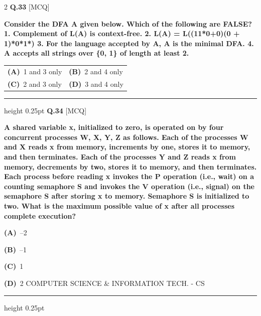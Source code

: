 \documentclass[a4paper,10pt,twoside]{article}
\begin{document}
\begin{multicols}{2}
\noindent\textbf{Q.33} \hfill {\footnotesize\textsf{[MCQ]}}
\par\vspace{2pt}
{\bfseries Consider the DFA A given below.
Which of the following are FALSE?
1. Complement of L(A) is context-free.
2. L(A) = L((11*0+0)(0 + 1)*0*1*)
3. For the language accepted by A, A is the minimal DFA.
4. A accepts all strings over \{0, 1\} of length at least 2. \par}
\par\vspace{2pt}\noindent
\begin{tabular*}{\columnwidth}{@{\extracolsep{\fill}}p{}p{}@{}}
\textbf{(A)}~1 and 3 only & \textbf{(B)}~2 and 4 only \\
\addlinespace[2pt]
\textbf{(C)}~2 and 3 only & \textbf{(D)}~3 and 4 only
\end{tabular*}
\par\vspace{6pt}\hrule height 0.25pt\vspace{6pt}
\noindent\textbf{Q.34} \hfill {\footnotesize\textsf{[MCQ]}}
\par\vspace{2pt}
{\bfseries A shared variable x, initialized to zero, is operated on by four concurrent processes W, X, Y, Z as
follows. Each of the processes W and X reads x from memory, increments by one, stores it to
memory, and then terminates. Each of the processes Y and Z reads x from memory, decrements by
two, stores it to memory, and then terminates. Each process before reading x invokes the P
operation (i.e., wait) on a counting semaphore S and invokes the V operation (i.e., signal) on the
semaphore S after storing x to memory. Semaphore S is initialized to two. What is the maximum
possible value of x after all processes complete execution? \par}
\par\vspace{2pt}\noindent
\textbf{(A)}~--2\par\vspace{2pt}\noindent
\textbf{(B)}~--1\par\vspace{2pt}\noindent
\textbf{(C)}~1\par\vspace{2pt}\noindent
\textbf{(D)}~2  COMPUTER SCIENCE \& INFORMATION TECH. - CS
\par\vspace{6pt}\hrule height 0.25pt\vspace{6pt}

\end{multicols}
\end{document}
